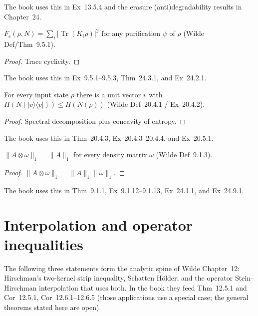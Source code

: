 The book uses this in Ex~13.5.4 and the erasure (anti)degradability results in
Chapter~24.

\begin{theorem}
  \label{thm:entFid_eq}
  $F_e(\rho,N)=\sum_i \lvert\operatorname{Tr}(K_i\rho)\rvert^2$ for any
  purification $\psi$ of $\rho$ (Wilde Def/Thm~9.5.1).
\end{theorem}

\begin{proof}
  Trace cyclicity.
\end{proof}

The book uses this in Ex~9.5.1--9.5.3, Thm~24.3.1, and Ex~24.2.1.

\begin{theorem}
  \label{thm:minOutputEntropy_pure}
  For every input state $\rho$ there is a unit vector $v$ with
  $H(N(\lvert v\rangle\langle v\rvert))\le H(N(\rho))$
  (Wilde Def~20.4.1 / Ex~20.4.2).
\end{theorem}

\begin{proof}
  Spectral decomposition plus concavity of entropy.
\end{proof}

The book uses this in Thm~20.4.3, Ex~20.4.3--20.4.4, and Ex~20.5.1.

\begin{theorem}
  \label{thm:traceNorm_kron_state}
  $\lVert A\otimes\omega\rVert_1=\lVert A\rVert_1$ for every density matrix
  $\omega$ (Wilde Def~9.1.3).
\end{theorem}

\begin{proof}
  $\lVert A\otimes\omega\rVert_1=\lVert A\rVert_1\lVert\omega\rVert_1$.
\end{proof}

The book uses this in Thm~9.1.1, Ex~9.1.12--9.1.13, Ex~24.1.1, and Ex~24.9.1.

\chapter{Interpolation and operator inequalities}

The following three statements form the analytic spine of Wilde Chapter~12:
Hirschman's two-kernel strip inequality, Schatten H\"older, and the operator
Stein--Hirschman interpolation that uses both. In the book they feed
Thm~12.5.1 and Cor~12.5.1, Cor~12.6.1--12.6.5 (those applications use a
special case; the general theorems stated here are open).

